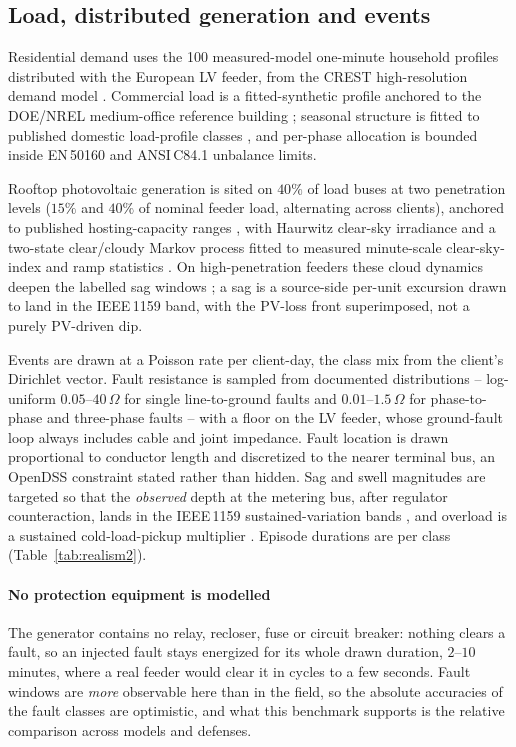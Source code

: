 \documentclass[review,12pt]{elsarticle}
\begin{document}
\subsection{Load, distributed generation and events}

Residential demand uses the 100 measured-model one-minute household
profiles distributed with the European LV feeder, from the CREST
high-resolution demand model \cite{richardson2010}. Commercial load is a
fitted-synthetic profile anchored to the DOE/NREL medium-office
reference building \cite{deru2011}; seasonal structure is fitted to
published domestic load-profile classes \cite{elexon}, and per-phase
allocation is bounded inside EN\,50160 and ANSI\,C84.1 unbalance limits.

Rooftop photovoltaic generation is sited on $40\%$ of load buses at two
penetration levels ($15\%$ and $40\%$ of nominal feeder load, alternating
across clients), anchored to published hosting-capacity ranges
\cite{hoke2013}, with Haurwitz clear-sky irradiance \cite{haurwitz1945}
and a two-state clear/cloudy Markov process fitted to measured
minute-scale clear-sky-index and ramp statistics
\cite{woyte2007,lave2013}. On high-penetration feeders these cloud
dynamics deepen the labelled sag windows \cite{katiraei2011}; a sag is a
source-side per-unit excursion drawn to land in the IEEE\,1159 band,
with the PV-loss front superimposed, not a purely PV-driven dip.

Events are drawn at a Poisson rate per client-day, the class mix from the
client's Dirichlet vector. Fault resistance is sampled from documented
distributions -- log-uniform $0.05$--$40\,\Omega$ for single
line-to-ground faults \cite{dagenhart2000} and $0.01$--$1.5\,\Omega$ for
phase-to-phase and three-phase faults \cite{deandrade2010} -- with a
floor on the LV feeder, whose ground-fault loop always includes cable
and joint impedance. Fault location is drawn proportional to conductor
length \cite{short2004} and discretized to the nearer terminal bus, an
OpenDSS constraint stated rather than hidden. Sag and swell magnitudes
are targeted so that the \emph{observed} depth at the metering bus,
after regulator counteraction, lands in the IEEE\,1159
sustained-variation bands \cite{ieee1159,bollen2000}, and overload is a
sustained cold-load-pickup multiplier \cite{short2004,ieeec37104}.
Episode durations are per class (Table~\ref{tab:realism2}).

\paragraph{No protection equipment is modelled}
The generator contains no relay, recloser, fuse or circuit breaker:
nothing clears a fault, so an injected fault stays energized for its
whole drawn duration, $2$--$10$ minutes, where a real feeder would clear
it in cycles to a few seconds. Fault windows are \emph{more} observable
here than in the field, so the absolute accuracies of the fault classes
are optimistic, and what this benchmark supports is the relative
comparison across models and defenses.
\end{document}
